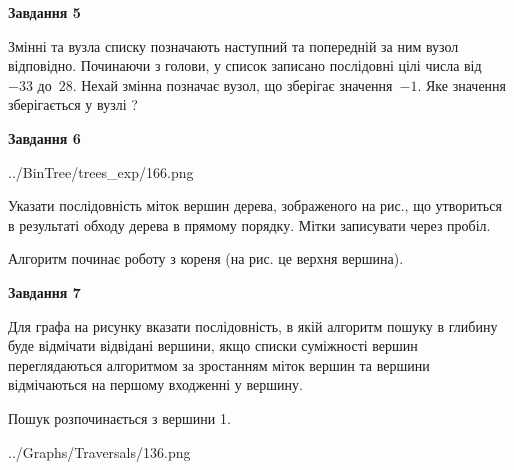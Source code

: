 \documentclass[12pt, ukrainian]{article}
\begin{document}
{\begin {large}
{\begin {center}\textbf{Завдання 5}\end {center}}\par
Змінні  та  вузла списку позначають наступний та попередній за ним вузол відповідно. Починаючи з голови, у список записано послідовні цілі числа від~$-33$ до~$28$. Нехай змінна  позначає вузол, що зберігає значення~$-1$.
Яке значення зберігається у вузлі  ?\par
\newpage

{\begin {center}\textbf{Завдання 6}\end {center}}\par

\begin{center}
	{../BinTree/trees_exp/166.png}
\end{center}
Указати послідовність міток вершин дерева, зображеного на рис., що утвориться в результаті обходу дерева в прямому порядку. Мітки записувати через пробіл.\par Алгоритм починає роботу з кореня (на рис. це верхня вершина).\par
\newpage

{\begin {center}\textbf{Завдання 7}\end {center}}\par
Для графа на рисунку вказати послідовність, в якій алгоритм пошуку в глибину буде відмічати відвідані вершини, якщо списки суміжності вершин переглядаються алгоритмом за зростанням міток вершин та вершини відмічаються на першому вход\-женні у вершину.\par
Пошук розпочинається з вершини 1.\par

\begin{center}
	{../Graphs/Traversals/136.png}
\end{center}\par
\newpage


\end{large}}
\end{document}

